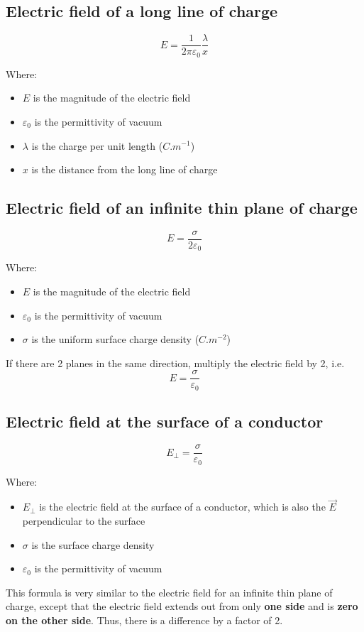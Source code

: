 \documentclass[11pt]{article}
\begin{document}
\subsection{Electric field of a long line of charge}
\label{sec:org986cc5d}
\[E = \frac{1}{2 \pi \varepsilon_0} \frac{\lambda}{x}\]

Where:
\begin{itemize}
\item \(E\) is the magnitude of the electric field
\item \(\varepsilon_0\) is the permittivity of vacuum
\item \(\lambda\) is the charge per unit length (\(\unit{C.m^{-1}}\))
\item \(x\) is the distance from the long line of charge
\end{itemize}
\subsection{Electric field of an infinite thin plane of charge}
\label{sec:org7f782d6}
\[E = \frac{\sigma}{2 \varepsilon_0}\]

Where:
\begin{itemize}
\item \(E\) is the magnitude of the electric field
\item \(\varepsilon_0\) is the permittivity of vacuum
\item \(\sigma\) is the uniform surface charge density (\(\unit{C.m^{-2}}\))
\end{itemize}

If there are 2 planes in the same direction, multiply the electric field by 2, i.e.
\[E = \frac{\sigma}{\varepsilon_0}\]
\subsection{Electric field at the surface of a conductor}
\label{sec:org3760b21}
\[E_{\perp} = \frac{\sigma}{\varepsilon_0}\]

Where:
\begin{itemize}
\item \(E_{\perp}\) is the electric field at the surface of a conductor, which is also the \(\vec{E}\) perpendicular to the surface
\item \(\sigma\) is the surface charge density
\item \(\varepsilon_0\) is the permittivity of vacuum
\end{itemize}

This formula is very similar to the electric field for an infinite thin plane of charge, except that the electric field extends out from only \textbf{one side} and is \textbf{zero on the other side}. Thus, there is a difference by a factor of 2.
\end{document}
